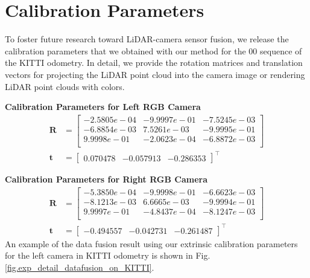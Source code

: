 


\section{Calibration Parameters}
To foster future research toward LiDAR-camera sensor
fusion, we release the calibration parameters that we obtained with our method for the 00 sequence of the KITTI odometry. In detail, we provide the rotation matrices and translation vectors for projecting the LiDAR point cloud into the camera image or rendering LiDAR point clouds with colors. 

\noindent \textbf{Calibration Parameters for Left RGB Camera}
\[
\begin{aligned}
\boldsymbol{R} &= 
\begin{bmatrix}
-2.5805e-04 &-9.9997e-01 &-7.5245e-03 \\
-6.8854e-03 &7.5261e-03 &-9.9995e-01 \\
9.9998e-01 &-2.0623e-04 &-6.8872e-03 \\
\end{bmatrix} \\
\boldsymbol{t} &= 
\begin{bmatrix}
0.070478 &-0.057913 &-0.286353
\end{bmatrix}^\top
\end{aligned}
\]


\noindent \textbf{Calibration Parameters for Right RGB Camera}
\[
\begin{aligned}
\boldsymbol{R} &= 
\begin{bmatrix}
-5.3850e-04 &-9.9998e-01 &-6.6623e-03 \\
-8.1213e-03 &6.6665e-03 &-9.9994e-01 \\
9.9997e-01 &-4.8437e-04 &-8.1247e-03 \\
\end{bmatrix} \\
\boldsymbol{t} &= 
\begin{bmatrix}
-0.494557 &-0.042731 &-0.261487 
\end{bmatrix}^\top
\end{aligned}
\]
An example of the data fusion result using our extrinsic calibration parameters for the left camera in KITTI odometry is shown in Fig. \ref{fig.exp_detail_datafusion_on_KITTI}.


